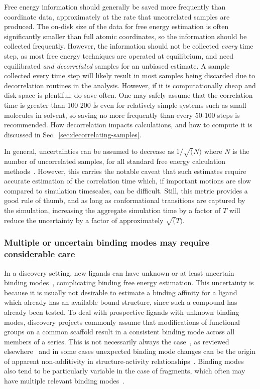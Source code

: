 \documentclass[9pt,bestpractices]{livecoms}
\begin{document}
Free energy information should generally be saved more frequently than coordinate data, approximately at the rate that uncorrelated samples are produced.  
The on-disk size of the data for free energy estimation is often significantly smaller than full atomic coordinates, so the information should be collected frequently. 
However, the information should not be collected \textit{every} time step, as most free energy techniques are operated at equilibrium, and need equilibrated \textit{and decorrelated} samples for an unbiased estimate.
A sample collected every time step will likely result in most samples being discarded due to decorrelation routines in the analysis. However, if it is computationally cheap and disk space is plentiful, do save often. One may safely assume that the correlation time is greater than 100-200 fs even for relatively simple systems such as small molecules in solvent, so saving no more frequently than every 50-100 steps is recommended. 
How decorrelation impacts calculations, and how to compute it is discussed in Sec.~\ref{sec:decorrelating-samples}.

In general, uncertainties can be assumed to decrease as $1/\sqrt(N)$ where $N$ is the number of uncorrelated samples, for all standard free energy calculation methods~\cite{shirts2005comparison}. However, this carries the notable caveat that such estimates require accurate estimation of the correlation time which, if important motions are slow compared to simulation timescales, can be difficult. Still, this metric provides a good rule of thumb, and as long as conformational transitions are captured by the simulation, increasing the aggregate simulation time by a factor of $T$ will reduce the uncertainty by a factor of approximately $\sqrt(T)$.

\subsubsection{Multiple or uncertain binding modes may require considerable care}
\label{sec:multiple_binding_modes}
In a discovery setting, new ligands can have unknown or at least uncertain binding modes~\cite{kaus2015how, plountprice2000analysis,mobley2009binding,calabro2016elucidation}, complicating binding free energy estimation.
This uncertainty is because it is usually not desirable to estimate a binding affinity for a ligand which already has an available bound structure, since such a compound has already been tested.
To deal with prospective ligands with unknown binding modes, discovery projects commonly assume that modifications of functional groups on a common scaffold result in a consistent binding mode across all members of a series.
This is not necessarily always the case~\cite{kaus2015how}, as reviewed elsewhere~\cite{mobley2009binding} and in some cases unexpected binding mode changes can be the origin of apparent non-additivity in structure-activity relationships~\cite{calabro2016elucidation}.
Binding modes also tend to be particularly variable in the case of fragments, which often may have multiple relevant binding modes~\cite{steinbrecher2015accurate}.
\end{document}
